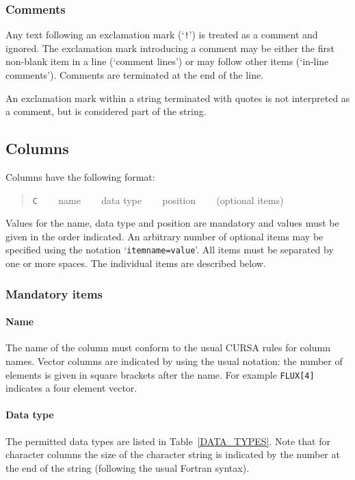 \documentclass[twoside,11pt]{article}
\renewcommand{\_}{\texttt{\symbol{95}}}
\begin{document}
\subsubsection{Comments}

Any text following an exclamation mark (`{\tt !}') is treated as a
comment and ignored.  The exclamation mark introducing a comment may
be either the first non-blank item in a line (`comment lines') or
may follow other items (`in-line comments').  Comments are terminated
at the end of the line.

An exclamation mark within a string terminated with quotes is not
interpreted as a comment, but is considered part of the string.


\subsection{Columns \label{COL}}

Columns have the following format:

\begin{quote}
{\tt C} ~~~ name ~~~ data type ~~~ position ~~~ (optional items)
\end{quote}

Values for the name, data type and position are mandatory and values
must be given in the order indicated.  An arbitrary number of optional
items may be specified using the notation `{\tt item\_name=value}'.
All items must be separated by one or more spaces.  The individual
items are described below.

\subsubsection{Mandatory items}

\paragraph{Name}  The name of the column must conform to the usual
CURSA rules for column names.  Vector columns are indicated by using
the usual notation: the number of elements is given in square brackets
after the name.  For example {\tt FLUX[4]} indicates a four element
vector.

\paragraph{Data type}  The permitted data types are listed in
Table~\ref{DATA_TYPES}.  Note that for character columns the size of
the character string is indicated by the number at the end of the string
(following the usual Fortran syntax).
\end{document}
